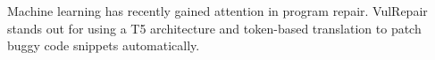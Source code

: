 Machine learning has recently gained attention in program repair. VulRepair stands out for using a T5 architecture and token-based translation to patch buggy code snippets automatically.
